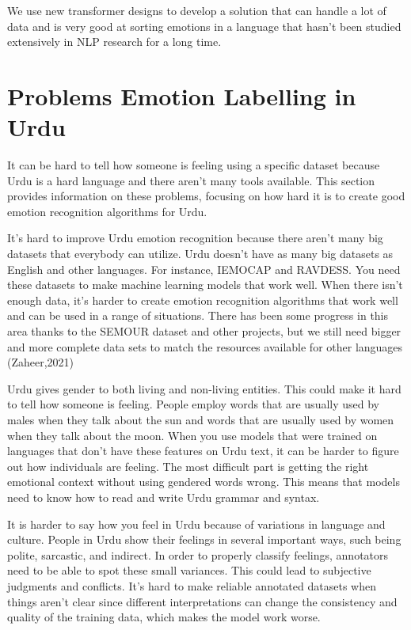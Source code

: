 \documentclass[12pt]{article}
\begin{document}
We use new transformer designs to develop a solution that can handle a lot of data and is very good at sorting emotions in a language that hasn't been studied extensively in NLP research for a long time.

\section{Problems Emotion Labelling in Urdu}

It can be hard to tell how someone is feeling using a specific dataset because Urdu is a hard language and there aren't many tools available. This section provides information on these problems, focusing on how hard it is to create good emotion recognition algorithms for Urdu.

It's hard to improve Urdu emotion recognition because there aren't many big datasets that everybody can utilize. Urdu doesn't have as many big datasets as English and other languages.
For instance, IEMOCAP and RAVDESS. You need these datasets to make machine learning models that work well. When there isn't enough data, it's harder to create emotion recognition algorithms that work well and can be used in a range of situations. There has been some progress in this area thanks to the SEMOUR dataset and other projects, but we still need bigger and more complete data sets to match the resources available for other languages (Zaheer,2021)

Urdu gives gender to both living and non-living entities. This could make it hard to tell how someone is feeling. People employ words that are usually used by males when they talk about the sun and words that are usually used by women when they talk about the moon. When you use models that were trained on languages that don't have these features on Urdu text, it can be harder to figure out how individuals are feeling. The most difficult part is getting the right emotional context without using gendered words wrong. This means that models need to know how to read and write Urdu grammar and syntax.

It is harder to say how you feel in Urdu because of variations in language and culture. People in Urdu show their feelings in several important ways, such being polite, sarcastic, and indirect. In order to properly classify feelings, annotators need to be able to spot these small variances. This could lead to subjective judgments and conflicts. It's hard to make reliable annotated datasets when things aren't clear since different interpretations can change the consistency and quality of the training data, which makes the model work worse.
\end{document}
